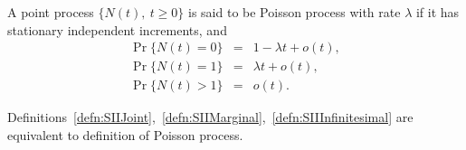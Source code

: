 \documentclass[a4paper,10pt]{article}
\begin{document}
\begin{defn}\label{defn:SIIInfinitesimal} A point process $\{N(t),~t\geqslant 0\}$ is said to be Poisson process with rate $\lambda$ if it has stationary independent increments, and 
\begin{eqnarray*}\label{eqn1}
\Pr\{N(t)=0\} &=& 1-\lambda t + o(t), \\
  \Pr\{N(t)=1\} &=& \lambda t + o(t), \\
  \Pr\{N(t)>1\} &=& o(t).
\end{eqnarray*}
\end{defn}

\begin{thm} Definitions~\ref{defn:SIIJoint},~\ref{defn:SIIMarginal},~\ref{defn:SIIInfinitesimal} are equivalent to definition of Poisson process.
\end{thm}
\end{document}
